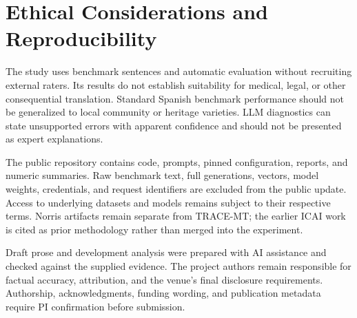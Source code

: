 \section{Ethical Considerations and Reproducibility}
The study uses benchmark sentences and automatic evaluation without recruiting external raters. Its results do not establish suitability for medical, legal, or other consequential translation. Standard Spanish benchmark performance should not be generalized to local community or heritage varieties. LLM diagnostics can state unsupported errors with apparent confidence and should not be presented as expert explanations.

The public repository contains code, prompts, pinned configuration, reports, and numeric summaries. Raw benchmark text, full generations, vectors, model weights, credentials, and request identifiers are excluded from the public update. Access to underlying datasets and models remains subject to their respective terms. Norris artifacts remain separate from TRACE-MT; the earlier ICAI work is cited as prior methodology rather than merged into the experiment.

Draft prose and development analysis were prepared with AI assistance and checked against the supplied evidence. The project authors remain responsible for factual accuracy, attribution, and the venue's final disclosure requirements. Authorship, acknowledgments, funding wording, and publication metadata require PI confirmation before submission.
